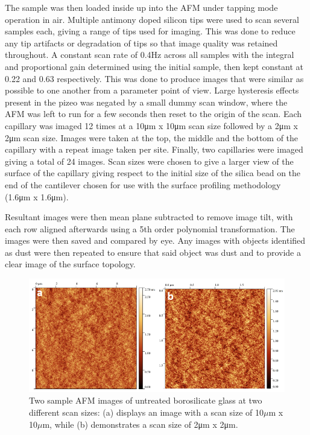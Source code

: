 The sample was then loaded inside up into the AFM under tapping mode operation in air. Multiple antimony doped silicon tips were used to scan several samples each, giving a range of tips used for imaging. This was done to reduce any tip artifacts or degradation of tips so that image quality was retained throughout. A constant scan rate of 0.4Hz across all samples with the integral and proportional gain determined using the initial sample, then kept constant at 0.22 and 0.63 respectively. This was done to produce images that were similar as possible to one another from a parameter point of view. Large hysteresis effects present in the pizeo was negated by a small dummy scan window, where the AFM was left to run for a few seconds then reset to the origin of the scan. Each capillary was imaged 12 times at a 10μm x 10μm scan size followed by a 2μm x 2μm scan size. Images were taken at the top, the middle and the bottom of the capillary with a repeat image taken per site. Finally, two capillaries were imaged giving a total of 24 images. Scan sizes were chosen to give a larger view of the surface of the capillary giving respect to the initial size of the silica bead on the end of the cantilever chosen for use with the surface profiling methodology (1.6μm x 1.6μm). 

Resultant images were then mean plane subtracted to remove image tilt, with each row aligned afterwards using a 5th order polynomial transformation. The images were then saved and compared by eye. Any images with objects identified as dust were then repeated to ensure that said object was dust and to provide a clear image of the surface topology.

\begin{figure}[h]     %
        \begin{center}
          \includegraphics[width=120mm]{chapter3/Figure9.png}
\end{center}
\caption{Two sample AFM images of untreated borosilicate glass at two different scan sizes: (a) displays an image with a scan size of 10$\mu$m x 10$\mu$m, while (b) demonstrates a scan size of 2μm x 2μm.}
\label{fig:figure9}                 %
\end{figure}   
  
